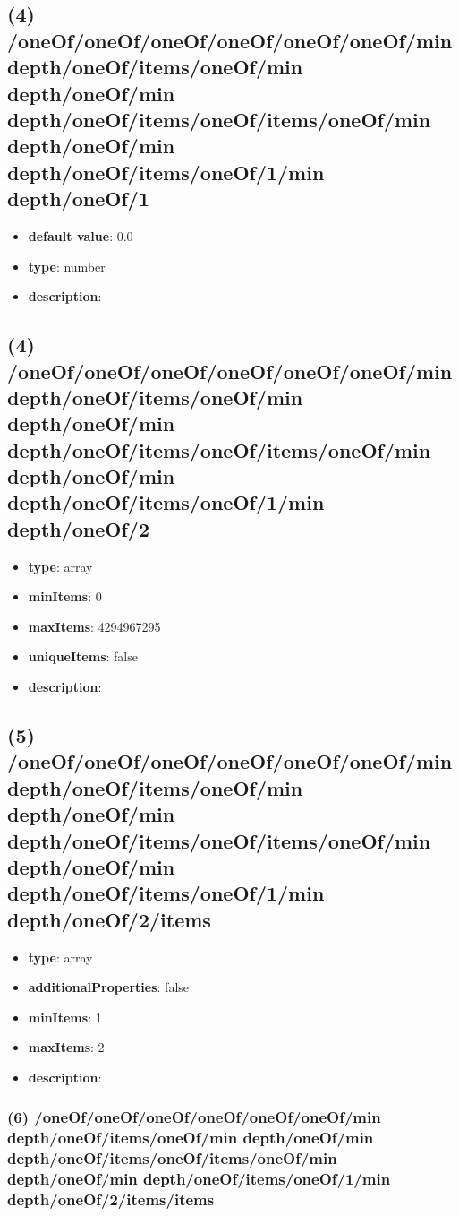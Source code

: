 \subsection{(4) /oneOf/oneOf/oneOf/oneOf/oneOf/oneOf/min depth/oneOf/items/oneOf/min depth/oneOf/min depth/oneOf/items/oneOf/items/oneOf/min depth/oneOf/min depth/oneOf/items/oneOf/1/min depth/oneOf/1}
\begin{itemize}[leftmargin=4em]\item {\bf default value}: 0.0
\item {\bf type}: number
\item {\bf description}: 
\end{itemize}\subsection{(4) /oneOf/oneOf/oneOf/oneOf/oneOf/oneOf/min depth/oneOf/items/oneOf/min depth/oneOf/min depth/oneOf/items/oneOf/items/oneOf/min depth/oneOf/min depth/oneOf/items/oneOf/1/min depth/oneOf/2}
\begin{itemize}[leftmargin=4em]\item {\bf type}: array
\item {\bf minItems}: 0
\item {\bf maxItems}: 4294967295
\item {\bf uniqueItems}: false
\item {\bf description}: 
\end{itemize}\subsection{(5) /oneOf/oneOf/oneOf/oneOf/oneOf/oneOf/min depth/oneOf/items/oneOf/min depth/oneOf/min depth/oneOf/items/oneOf/items/oneOf/min depth/oneOf/min depth/oneOf/items/oneOf/1/min depth/oneOf/2/items}
\begin{itemize}[leftmargin=5em]\item {\bf type}: array
\item {\bf additionalProperties}: false
\item {\bf minItems}: 1
\item {\bf maxItems}: 2
\item {\bf description}: 
\end{itemize}\subsubsection{(6) /oneOf/oneOf/oneOf/oneOf/oneOf/oneOf/min depth/oneOf/items/oneOf/min depth/oneOf/min depth/oneOf/items/oneOf/items/oneOf/min depth/oneOf/min depth/oneOf/items/oneOf/1/min depth/oneOf/2/items/items}
